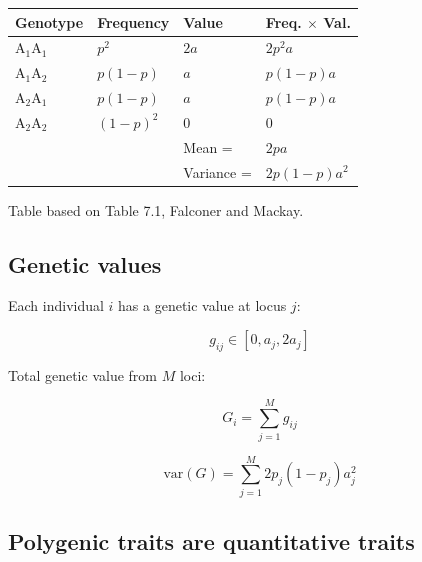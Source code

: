 \documentclass[
  letterpaper,
  DIV=11,
  numbers=noendperiod]{scrartcl}
\begin{document}
\begin{longtable}[]{@{}
  >{\raggedright\arraybackslash}p{}
  >{\raggedleft\arraybackslash}p{}
  >{\raggedleft\arraybackslash}p{}
  >{\raggedleft\arraybackslash}p{}@{}}
\toprule\noalign{}
\begin{minipage}[b]{\linewidth}\raggedright
Genotype
\end{minipage} & \begin{minipage}[b]{\linewidth}\raggedleft
Frequency
\end{minipage} & \begin{minipage}[b]{\linewidth}\raggedleft
Value
\end{minipage} & \begin{minipage}[b]{\linewidth}\raggedleft
Freq. \(\times\) Val.
\end{minipage} \\
\midrule\noalign{}
\endhead
\bottomrule\noalign{}
\endlastfoot
\(\mathrm{A}_1\mathrm{A}_1\) & \(p^2\) & \(2a\) & \(2p^2a\) \\
\(\mathrm{A}_1\mathrm{A}_2\) & \(p(1-p)\) & \(a\) & \(p(1-p)a\) \\
\(\mathrm{A}_2\mathrm{A}_1\) & \(p(1-p)\) & \(a\) & \(p(1-p)a\) \\
\(\mathrm{A}_2\mathrm{A}_2\) & \((1-p)^2\) & \(0\) & \(0\) \\
& & Mean = & \(2pa\) \\
& & Variance = & \(2p(1-p)a^2\) \\
\end{longtable}

Table based on Table 7.1, Falconer and Mackay.

\subsection{Genetic values}\label{genetic-values}

Each individual \(i\) has a genetic value at locus \(j\):

\[
g_{ij} \in [0, a_j, 2a_j]
\]

Total genetic value from \(M\) loci:

\[
G_i = \sum_{j = 1}^M g_{ij}
\]

\[
\mathrm{var}(G) = \sum_{j = 1}^M 2p_j(1-p_j)a_j^2
\]

\subsection{Polygenic traits are quantitative
traits}\label{polygenic-traits-are-quantitative-traits}
\end{document}
